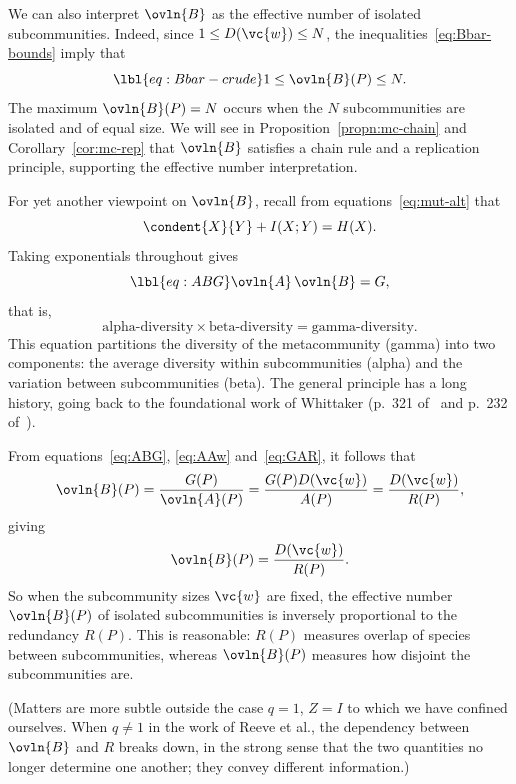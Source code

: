 We can also interpret $\ovln{B}$ as the effective%
%
%
% 
number of isolated subcommunities.  Indeed, since $1 \leq D(\vc{w}) \leq
N$, the inequalities~\eqref{eq:Bbar-bounds} imply that
% 
\begin{equation}
\lbl{eq:Bbar-crude}
1 \leq \ovln{B}(P) \leq N.
\end{equation}
% 
The maximum $\ovln{B}(P) = N$ occurs when the $N$ subcommunities are
isolated and of equal size.  We will see in
Proposition~\ref{propn:mc-chain} and Corollary~\ref{cor:mc-rep} that
$\ovln{B}$ satisfies a chain rule and a replication principle, supporting
the effective number interpretation.

For yet another viewpoint on $\ovln{B}$, recall from
equations~\eqref{eq:mut-alt} that
\[
\condent{X}{Y} + I(X; Y) = H(X).
\]
Taking exponentials throughout gives
% 
\begin{equation}
\lbl{eq:ABG}
\ovln{A} \, \ovln{B} = G,
\end{equation}
% 
that is,
\[
\text{alpha-diversity} \times \text{beta-diversity}
=
\text{gamma-diversity}.
\]
This equation partitions%
%  
%
% 
the diversity of the metacommunity (gamma) into two components: the average
diversity within subcommunities (alpha) and the variation between
subcommunities (beta).  The general principle has a long history, going
back to the foundational work of Whittaker%
%
% 
(p.~321 of~\cite{WhitVSM} and p.~232 of~\cite{WhitEMS}).

From equations~\eqref{eq:ABG}, \eqref{eq:AAw} and~\eqref{eq:GAR}, it
follows that 
\[
\ovln{B}(P)
=
\frac{G(P)}{\ovln{A}(P)}
=
\frac{G(P)D(\vc{w})}{A(P)} 
=
\frac{D(\vc{w})}{R(P)}, 
\]
giving
\[
\ovln{B}(P) = \frac{D(\vc{w})}{R(P)}.
\]
So when the subcommunity sizes $\vc{w}$ are fixed, the effective number
$\ovln{B}(P)$ of isolated subcommunities is inversely proportional to the
redundancy $R(P)$.  This is reasonable: $R(P)$ measures overlap of species
between subcommunities, whereas $\ovln{B}(P)$ measures how disjoint the 
subcommunities are.

(Matters are more subtle outside the case $q = 1$, $Z = I$ to which we have
confined ourselves.  When $q \neq 1$ in the work of Reeve et al., the
dependency between $\ovln{B}$ and $R$ breaks down, in the strong sense that
the two quantities no longer determine one another; they convey
different information.)


